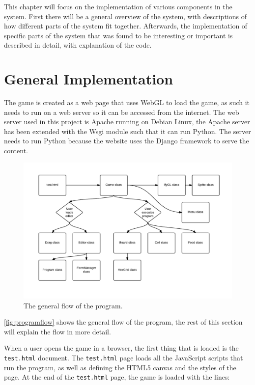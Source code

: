 This chapter will focus on the implementation of various components in the system. First there will be a general overview of the system, with descriptions of how different parts of the system fit together. Afterwards, the implementation of specific parts of the system that was found to be interesting or important is described in detail, with explanation of the code.

\section{General Implementation}
The game is created as a web page that uses WebGL to load the game, as such it needs to run on a web server so it can be accessed from the internet. The web server used in this project is Apache running on Debian Linux, the Apache server has been extended with the Wsgi module such that it can run Python. The server needs to run Python because the website uses the Django framework to serve the content.

\begin{figure}[ht]
\includegraphics[width=\textwidth]{img/Program_flow.pdf}
\caption{The general flow of the program.}
\label{fig:programflow}
\end{figure}

\autoref{fig:programflow} shows the general flow of the program, the rest of this section will explain the flow in more detail.\newline

When a user opens the game in a browser, the first thing that is loaded is the \texttt{test.html} document. The \texttt{test.html} page loads all the JavaScript scripts that run the program, as well as defining the HTML5 canvas and the styles of the page. At the end of the \texttt{test.html} page, the game is loaded with the lines: 

